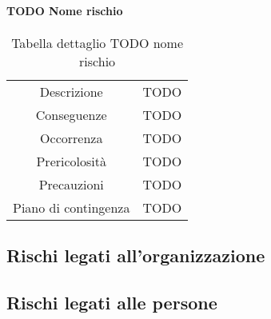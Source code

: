 \paragraph{TODO Nome rischio}
\renewcommand{\arraystretch}{1}
    \begin{table}[H]
        \begin{center}
            \setlength{\aboverulesep}{0pt}
            \setlength{\belowrulesep}{0pt}
            \setlength{\extrarowheight}{.75ex}
            \begin{tabular}{ c c }
                \rowcolor{AzzuroGruppo!30} 
                \toprule
                Descrizione & TODO \\
                Conseguenze & TODO \\
                Occorrenza & TODO \\
                Prericolosità & TODO \\
                Precauzioni & TODO \\
                Piano di contingenza & TODO \\
                \bottomrule
            \end{tabular}
            \caption{Tabella dettaglio TODO nome rischio}
        \end{center}
    \end{table}

\subsection{Rischi legati all’organizzazione}

\subsection{Rischi legati alle persone}
